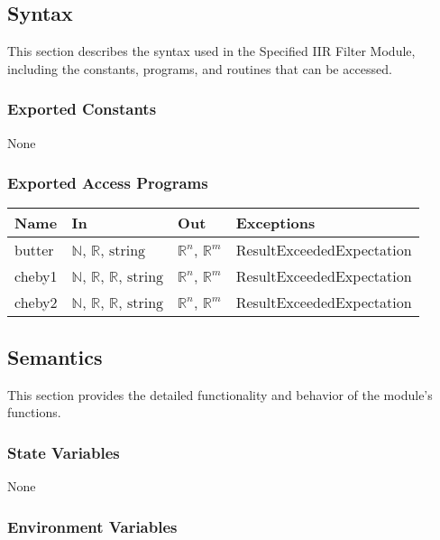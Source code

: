 \documentclass[12pt, titlepage]{article}
\begin{document}
\subsection{Syntax}

This section describes the syntax used in the Specified IIR Filter Module,
including the constants, programs, and routines that can be accessed.

\subsubsection{Exported Constants}

None

\subsubsection{Exported Access Programs}

\begin{center}
\begin{tabular}{p{2cm} p{4cm} p{4cm} p{5cm}}
\hline
\textbf{Name} & \textbf{In} & \textbf{Out} & \textbf{Exceptions} \\
\hline
butter & $\mathbb{N}$, $\mathbb{R}$, $\text{string}$ & $\mathbb{R}^{n}$,
$\mathbb{R}^{m}$ & ResultExceededExpectation \\
cheby1 & $\mathbb{N}$, $\mathbb{R}$, $\mathbb{R}$, $\text{string}$ &
$\mathbb{R}^{n}$, $\mathbb{R}^{m}$ & ResultExceededExpectation \\
cheby2 & $\mathbb{N}$, $\mathbb{R}$, $\mathbb{R}$, $\text{string}$ &
$\mathbb{R}^{n}$, $\mathbb{R}^{m}$ & ResultExceededExpectation \\
\hline
\end{tabular}
\end{center}

\subsection{Semantics}

This section provides the detailed functionality and behavior of the module’s
functions.

\subsubsection{State Variables}

None

\subsubsection{Environment Variables}
\end{document}
